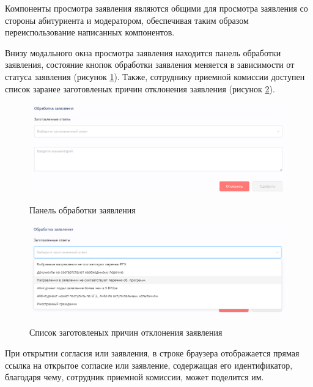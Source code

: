 Компоненты просмотра заявления являются общими для просмотра заявления со стороны абитуриента и модератором, обеспечивая таким образом переиспользование написанных компонентов.

Внизу модального окна просмотра заявления находится панель обработки заявления, состояние кнопок обработки заявления меняется в зависимости от статуса заявления (рисунок \ref{fig:moderatorstatementpanel}). Также, сотруднику приемной комиссии доступен список заранее заготовленых причин отклонения заявления (рисунок \ref{fig:moderatorstatenentpanellist}).

\begin{figure}[H]
\begin{center}
\includegraphics[width=1\hsize]{fig/moderator-statement-panel.png}\\[2mm]
\caption{Панель обработки заявления}\label{fig:moderatorstatementpanel}
\end{center}
\end{figure}

\begin{figure}[H]
\begin{center}
\includegraphics[width=1\hsize]{fig/moderator-statement-cansel-list.png}\\[2mm]
\caption{Список заготовленых причин отклонения заявления}\label{fig:moderatorstatenentpanellist}
\end{center}
\end{figure}

При открытии согласия или заявления, в строке браузера отображается прямая ссылка на открытое согласие или заявление, содержащая его идентификатор, благодаря чему, сотрудник приемной комиссии, может поделится им.

